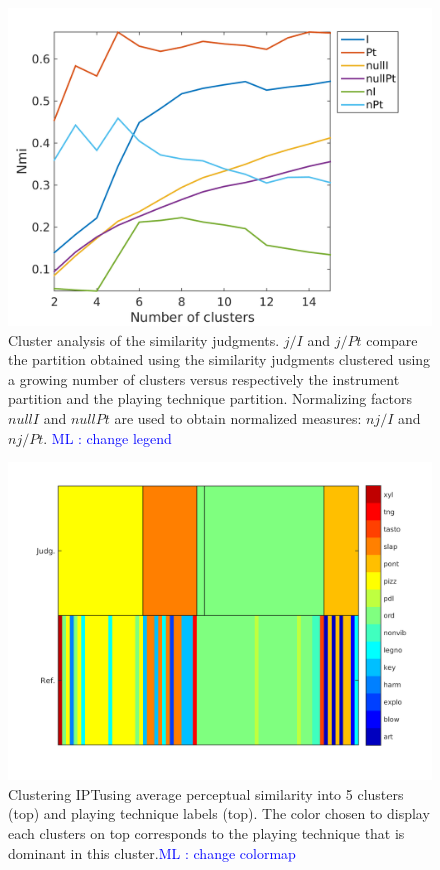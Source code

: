 \documentclass{article}
\newcommand{\ipt}{IPT}
\newcommand{\ml}[1]{\textcolor{blue}{ML : #1}}
\begin{document}
\begin{figure}
\center
\includegraphics[width = \textwidth]{figures/clusterAnalysis.png}
\caption{Cluster analysis of the similarity judgments. $j/I$ and $j/Pt$ compare the partition obtained using the similarity judgments clustered using a growing number of clusters versus respectively the instrument partition and the playing technique partition. Normalizing factors $nullI$ and $nullPt$ are used to obtain normalized measures: $nj/I$ and $nj/Pt$. \ml{change legend}}
\label{fig:clusters}
\end{figure}

\begin{figure}
\center
\includegraphics[width = \textwidth]{figures/groupModes.png}
\caption{Clustering \ipt using average perceptual similarity into 5 clusters (top) and playing technique labels (top). The color chosen to display each clusters on top corresponds to the playing technique that is dominant in this cluster.\ml{change colormap}}
\label{fig:gm}
\end{figure}
\end{document}
